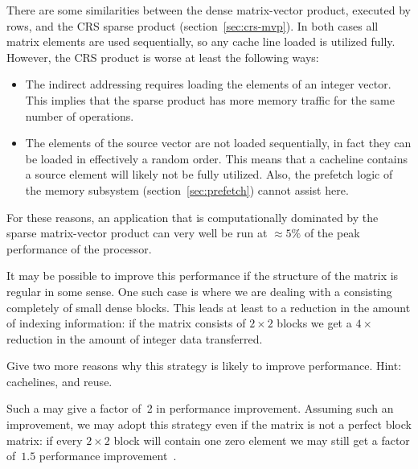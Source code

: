 
There are some similarities between the dense matrix-vector product,
executed by rows, and the \ac{CRS} sparse product
(section~\ref{sec:crs-mvp}). In both cases all matrix elements are
used sequentially, so any cache line loaded is utilized
fully. However, the \ac{CRS} product is worse at least the following
ways:
\begin{itemize}
\item The indirect addressing requires loading the elements of an
  integer vector. This implies that the sparse product has more memory
  traffic for the same number of operations.
\item The elements of the source vector are not loaded sequentially,
  in fact they can be loaded in effectively a random order. This means
  that a cacheline contains a source element will likely not be fully
  utilized. Also, the prefetch logic of the memory subsystem
  (section~\ref{sec:prefetch}) cannot assist here.
\end{itemize}
For these reasons, an application that is computationally dominated by
the sparse matrix-vector product can very well be run at $\approx5\%$
of the peak performance of the processor.

It may be possible to improve this performance if the structure of the
matrix is regular in some sense. One such case is where we are dealing
with a  consisting completely of small dense
blocks. This leads at least to a reduction in the amount of indexing
information: if the matrix consists of $2\times2$ blocks we get a
$4\times$ reduction in the amount of integer data transferred.
\begin{exercise}
  Give two more reasons why this strategy is likely to improve
  performance. Hint: cachelines, and reuse.
\end{exercise}
Such a  may give a factor of~2 in
performance improvement. Assuming such an improvement, we may adopt
this strategy even if the matrix is not a perfect block matrix: if
every $2\times2$ block will contain one zero element we may still get
a factor of~$1.5$ performance
improvement~\cite{vuduc:thesis,ButtEijkLang:spmvp}.


